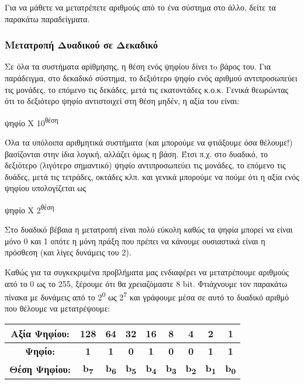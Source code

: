 Για να μάθετε να μετατρέπετε αριθμούς από το ένα σύστημα στο άλλο, δείτε τα παρακάτω παραδείγματα.

\subsubsection*{Μετατροπή Δυαδικού σε Δεκαδικό}

Σε όλα τα συστήματα αρίθμησης, η θέση ενός ψηφίου δίνει τo βάρος του. Για παράδειγμα, στο δεκαδικό σύστημα, το δεξιότερο ψηφίο ενός αριθμού αντιπροσωπεύει τις μονάδες, το επόμενο τις δεκάδες, μετά τις εκατοντάδες κ.ο.κ. Γενικά θεωρώντας ότι το δεξιότερο ψηφίο αντιστοιχεί στη θέση μηδέν, η αξία του είναι:

ψηφίο Χ 10\textsuperscript{θέση} 

Όλα τα υπόλοιπα αριθμητικά συστήματα (και μπορούμε να φτιάξουμε όσα θέλουμε!) βασίζονται στην ίδια λογική, αλλάζει όμως η βάση. Έτσι π.χ. στο δυαδικό, το δεξιότερο (λιγότερο σημαντικό) ψηφίο αντιπροσωπεύει τις μονάδες, το επόμενο τις δυάδες, μετά τις τετράδες, οκτάδες κλπ. και γενικά μπορούμε να πούμε ότι η αξία ενός ψηφίου υπολογίζεται ως

ψηφίο Χ 2\textsuperscript{θέση}

Στο δυαδικό βέβαια η μετατροπή είναι πολύ εύκολη καθώς τα ψηφία μπορεί να είναι μόνο 0 και 1 οπότε η μόνη πράξη που πρέπει να κάνουμε ουσιαστικά είναι η πρόσθεση (και λίγες δυνάμεις του 2).

Καθώς για τα συγκεκριμένα προβλήματα μας ενδιαφέρει να μετατρέπουμε αριθμούς από το 0 ως το 255, ξέρουμε ότι θα χρειαζόμαστε 8 bit. Φτιάχνουμε τον παρακάτω πίνακα με δυνάμεις από το 2\textsuperscript{0} ως 2\textsuperscript{7} και γράφουμε μέσα σε αυτό το δυαδικό αριθμό που θέλουμε να μετατρέψουμε:

\begin{center}
\begin{tabular}{|c|c|c|c|c|c|c|c|c|}
\hline
Αξία Ψηφίου: & 128 & 64 & 32 & 16 & 8 & 4 & 2 & 1 \\
\hline
\textbf{Ψηφίο:} & \textbf{1} & \textbf{1} & \textbf{0} & \textbf{1} & \textbf{0} & \textbf{0} & \textbf{1} & \textbf{1} \\
\hline
\textbf{Θέση Ψηφίου:} & \textbf{b\textsubscript{7}}& \textbf{b\textsubscript{6}} & \textbf{b\textsubscript{5}} & \textbf{b\textsubscript{4}} & \textbf{b\textsubscript{3}}& \textbf{b\textsubscript{2}} & \textbf{b\textsubscript{1}} & \textbf{b\textsubscript{0}}  \\
\hline
\end{tabular}
\end{center}


